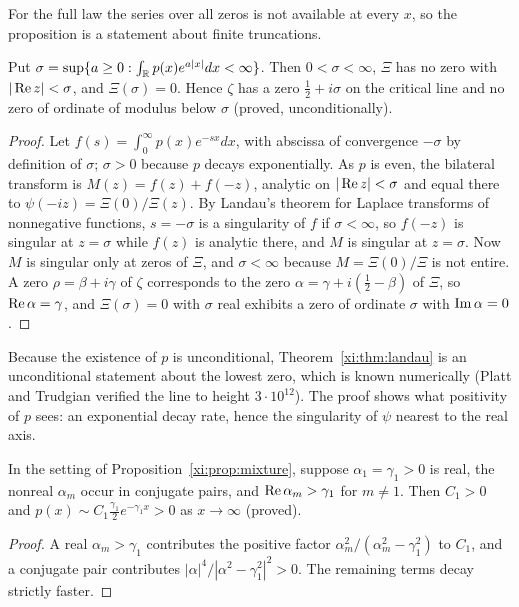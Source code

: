 For the full law the series over all zeros is not available at every $x$, so the proposition is a statement about finite truncations.

\begin{theorem}\label{xi:thm:landau}
Put $\sigma=\sup\{a\ge0:\int_{\mathbb{R}} p(x)e^{a|x|}dx<\infty\}$. Then $0<\sigma<\infty$, $\Xi$ has no zero with $|\operatorname{Re} z|<\sigma$, and $\Xi(\sigma)=0$. Hence $\zeta$ has a zero $\frac12+i\sigma$ on the critical line and no zero of ordinate of modulus below $\sigma$ (proved, unconditionally).
\end{theorem}

\begin{proof}
Let $f(s)=\int_0^\infty p(x)e^{-sx}dx$, with abscissa of convergence $-\sigma$ by definition of $\sigma$; $\sigma>0$ because $p$ decays exponentially. As $p$ is even, the bilateral transform is $M(z)=f(z)+f(-z)$, analytic on $|\operatorname{Re} z|<\sigma$ and equal there to $\psi(-iz)=\Xi(0)/\Xi(z)$. By Landau's theorem for Laplace transforms of nonnegative functions, $s=-\sigma$ is a singularity of $f$ if $\sigma<\infty$, so $f(-z)$ is singular at $z=\sigma$ while $f(z)$ is analytic there, and $M$ is singular at $z=\sigma$. Now $M$ is singular only at zeros of $\Xi$, and $\sigma<\infty$ because $M=\Xi(0)/\Xi$ is not entire. A zero $\rho=\beta+i\gamma$ of $\zeta$ corresponds to the zero $\alpha=\gamma+i(\frac12-\beta)$ of $\Xi$, so $\operatorname{Re}\alpha=\gamma$, and $\Xi(\sigma)=0$ with $\sigma$ real exhibits a zero of ordinate $\sigma$ with $\operatorname{Im}\alpha=0$.
\end{proof}

Because the existence of $p$ is unconditional, Theorem~\ref{xi:thm:landau} is an unconditional statement about the lowest zero, which is known numerically (Platt and Trudgian \cite{PT21} verified the line to height $3\cdot10^{12}$). The proof shows what positivity of $p$ sees: an exponential decay rate, hence the singularity of $\psi$ nearest to the real axis.

\begin{lemma}\label{xi:lem:tail}
In the setting of Proposition~\ref{xi:prop:mixture}, suppose $\alpha_1=\gamma_1>0$ is real, the nonreal $\alpha_m$ occur in conjugate pairs, and $\operatorname{Re}\alpha_m>\gamma_1$ for $m\ne1$. Then $C_1>0$ and $p(x)\sim C_1\frac{\gamma_1}2e^{-\gamma_1x}>0$ as $x\to\infty$ (proved).
\end{lemma}

\begin{proof}
A real $\alpha_m>\gamma_1$ contributes the positive factor $\alpha_m^2/(\alpha_m^2-\gamma_1^2)$ to $C_1$, and a conjugate pair contributes $|\alpha|^4/|\alpha^2-\gamma_1^2|^2>0$. The remaining terms decay strictly faster.
\end{proof}

